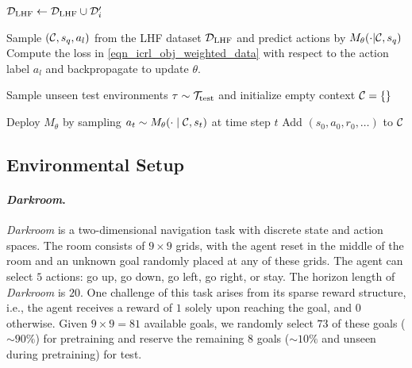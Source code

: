 \documentclass{article}
\begin{document}
\begin{algorithm}
\begin{algorithmic}[1]
            \STATE ${\mathcal D}_\text{LHF} \leftarrow {\ensuremath{\mathcal D}}_\text{LHF} \cup {\ensuremath{\mathcal D}}_i'$
        \ENDFOR

        
        \STATE {}
            \STATE Sample $({\mathcal C}, s_q, a_l)$ from the LHF dataset ${\mathcal D}_\text{LHF}$ and predict actions by $M_\theta(\cdot  | {\mathcal C}, s_q)$
            \STATE Compute the loss in \eqref{eqn_icrl_obj_weighted_data} with respect to the action label $a_l$ and backpropagate to update $\theta$.
        \ENDWHILE

        
        \STATE {}
        \STATE Sample unseen test environments $\tau \sim {\ensuremath{\mathcal T}}_{\text{test}}$ and initialize empty context ${\mathcal C} = \{\}$

                \STATE Deploy $M_\theta$ by sampling $a_t \sim M_{\theta}(\cdot  \mid {\ensuremath{\mathcal C}}, s_t)$ at time step $t$
                \STATE Add $(s_0, a_0, r_0, \ldots)$ to ${\mathcal C}$
        \ENDFOR
\end{algorithmic}
\end{algorithm}





\subsection{Environmental Setup}
\label{append_env_setup}



\paragraph{\textit{Darkroom}.}
%
\textit{Darkroom} is a two-dimensional navigation task with discrete state and action spaces. The room consists of $9 \times 9$ grids, with the agent reset in the middle of the room and an unknown goal randomly placed at any of these grids. The agent can select $5$ actions: go up, go down, go left, go right, or stay. The horizon length of \textit{Darkroom} is $20$. One challenge of this task arises from its sparse reward structure, i.e., the agent receives a reward of $1$ solely upon reaching the goal, and $0$ otherwise. 
%
Given $9 \times 9 = 81$ available goals, we randomly select $73$ of these goals ($\sim 90\%$) for pretraining and reserve the remaining $8$ goals ($\sim 10\%$ and unseen during pretraining) for test.
\end{document}
